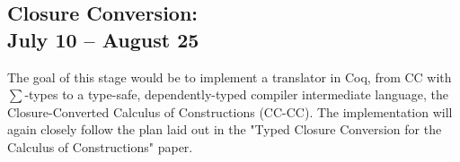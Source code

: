 \documentclass[sigconf,nonacm=true,10pt]{acmart}
\begin{document}
\subsection[Closure Conversion\\ July 10 -- August 25]{Closure Conversion:\\ \large{July 10 -- August 25}}
The goal of this stage would be to implement a translator in Coq, from CC with $\sum$-types to a type-safe, dependently-typed compiler intermediate language, the Closure-Converted Calculus of Constructions (CC-CC). The implementation will again closely follow the plan laid out in the "Typed Closure Conversion for the Calculus of Constructions" paper. 



\end{document}
